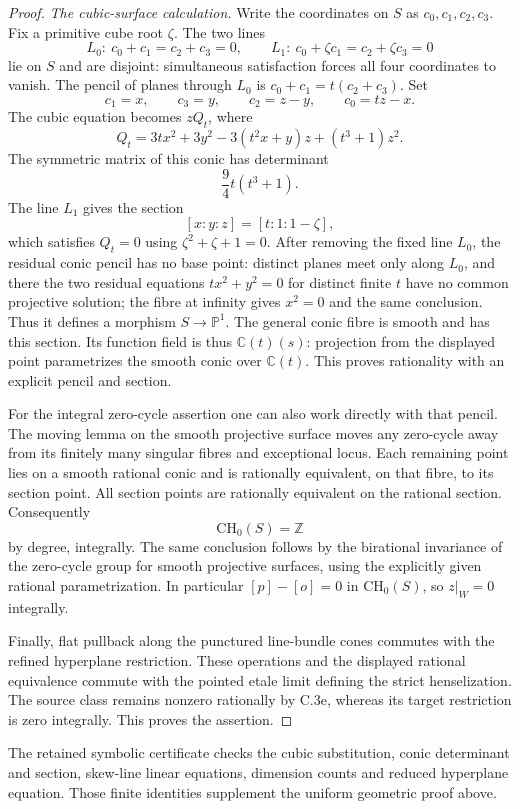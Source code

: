 \begin{proof}
\emph{The cubic-surface calculation.}
Write the coordinates on $S$ as $c_0,c_1,c_2,c_3$.
Fix a primitive cube root $\zeta$. The two lines
\[
 L_0:\ c_0+c_1=c_2+c_3=0,
 \qquad
 L_1:\ c_0+\zeta c_1=c_2+\zeta c_3=0
\]
lie on $S$ and are disjoint: simultaneous satisfaction
forces all four coordinates to vanish. The pencil of
planes through $L_0$ is
$c_0+c_1=t(c_2+c_3)$. Set
\[
 c_1=x,\qquad c_3=y,\qquad
 c_2=z-y,\qquad c_0=tz-x.
\]
The cubic equation becomes $zQ_t$, where
\[
 Q_t=3tx^2+3y^2-3(t^2x+y)z+(t^3+1)z^2.
\]
The symmetric matrix of this conic has determinant
\[
                         \frac94 t(t^3+1).
\]
The line $L_1$ gives the section
\[
                         [x:y:z]=[t:1:1-\zeta],
\]
which satisfies $Q_t=0$ using $\zeta^2+\zeta+1=0$.
After removing the fixed line $L_0$, the residual
conic pencil has no base point: distinct planes meet
only along $L_0$, and there the two residual equations
$tx^2+y^2=0$ for distinct finite $t$ have no common
projective solution; the fibre at infinity gives
$x^2=0$ and the same conclusion. Thus it defines a
morphism $S\to\mathbb P^1$. The general conic fibre
is smooth and has this section. Its function field is thus
$\mathbb C(t)(s)$: projection from the displayed point
parametrizes the smooth conic over $\mathbb C(t)$.
This proves rationality with an explicit pencil and
section.

For the integral zero-cycle assertion one can also work
directly with that pencil. The moving lemma on the smooth
projective surface moves any zero-cycle away from its
finitely many singular fibres and exceptional locus.
Each remaining point lies on a smooth rational conic and
is rationally equivalent, on that fibre, to its section
point. All section points are rationally equivalent on
the rational section. Consequently
\[
                         \mathrm{CH}_0(S)=\mathbb Z
\]
by degree, integrally. The same conclusion follows by
the birational invariance of the zero-cycle group for
smooth projective surfaces, using the explicitly given
rational parametrization. In particular $[p]-[o]=0$
in $\mathrm{CH}_0(S)$, so $z|_W=0$ integrally.

Finally, flat pullback along the punctured line-bundle
cones commutes with the refined hyperplane restriction.
These operations and the displayed rational equivalence
commute with the pointed etale limit defining the strict
henselization. The source class remains nonzero rationally
by C.3e, whereas its target restriction is zero integrally.
This proves the assertion.
\end{proof}

The retained symbolic certificate checks the cubic
substitution, conic determinant and section, skew-line
linear equations, dimension counts and reduced hyperplane
equation. Those finite identities supplement the uniform
geometric proof above.
